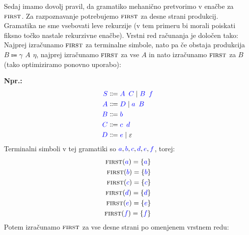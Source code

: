 \documentclass{article}
\newcommand{\Ex}{\textbf{Npr.:}\ }
\newcommand{\FIRST}{\textsc{first}}
\newcommand{\Symbol}[1]{\textcolor{blue}{#1}}
\newcommand{\Null}{\varepsilon}
\newcommand{\Arrow}{\Coloneq}
\newcommand{\Seq}{{\ \,}}
\newcommand{\Union}{\mathrel{|}}
\begin{document}
Sedaj imamo dovolj pravil, da gramatiko mehanično pretvorimo v enačbe za $\FIRST$.
Za razpoznavanje potrebujemo $\FIRST$ za desne strani produkcij.
Gramatika ne sme vsebovati leve rekurzije (v tem primeru bi morali poiskati fiksno točko nastale rekurzivne enačbe).
Vrstni red računanja je določen tako: Najprej izračunamo $\FIRST$ za terminalne simbole, nato pa če obstaja produkcija ${B \Arrow \gamma \Seq A \Seq \eta}$, najprej izračunamo $\FIRST$ za vse $A$ in nato izračunamo $\FIRST$ za $B$ (tako optimiziramo ponovno uporabo):

\Ex
\begin{equation*}
  \begin{aligned}
    \Symbol{S} &\Arrow \Symbol{A} \Seq \Symbol{C} \Union \Symbol{B} \Seq \Symbol{f} \\
    \Symbol{A} &\Arrow \Symbol{D} \Union \Symbol{a} \Seq \Symbol{B} \\
    \Symbol{B} &\Arrow \Symbol{b}\\
    \Symbol{C} &\Arrow \Symbol{c} \Seq \Symbol{d}\\
    \Symbol{D} &\Arrow \Symbol{e} \Union \Null
  \end{aligned}
\end{equation*}
Terminalni simboli v tej gramatiki so $\Symbol{a}, \Symbol{b}, \Symbol{c}, \Symbol{d}, \Symbol{e}, \Symbol{f}$, torej:
\begin{align*}
  \FIRST(\Symbol{a}) = \{\Symbol{a}\}\\
  \FIRST(\Symbol{b}) = \{\Symbol{b}\}\\
  \FIRST(\Symbol{c}) = \{\Symbol{c}\}\\
  \FIRST(\Symbol{d}) = \{\Symbol{d}\}\\
  \FIRST(\Symbol{e}) = \{\Symbol{e}\}\\
  \FIRST(\Symbol{f}) = \{\Symbol{f}\}
\end{align*}
Potem izračunamo $\FIRST$ za vse desne strani po omenjenem vrstnem redu:
\end{document}
